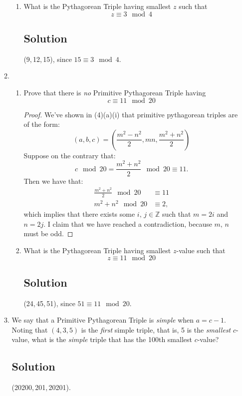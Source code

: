 \documentclass[12pt]{amsart}
\begin{document}
\begin{enumerate}
\begin{enumerate}
\begin{enumerate}
\item What is the Pythagorean Triple having smallest $z$ such that
\[ z \equiv 3 \mod 4 \]
\subsection*{Solution}
(9,\,12,\,15), since $15 \equiv 3 \mod 4$.

\end{enumerate}
\item
\begin{enumerate}\setlength{\itemsep}{6pt}
\item Prove that there is {\it no} Primitive Pythagorean Triple having
\[c \equiv 11\mod 20\]
\begin{proof}
We've shown in (4)(a)(i) that primitive pythagorean triples are of the form:
\[ (a, b, c) = \left( \frac{m^2 - n^2} 2, mn, \frac{m^2 + n^2} 2 \right) \]
Suppose on the contrary that:
\[ c \mod 20 = \frac {m^2 + n^2} 2 \mod 20 \equiv 11. \]
Then we have that:
\begin{align*}
\frac {m^2 + n^2} 2 \mod 20 &\equiv 11 \\
m^2 + n^2 \mod 20 &\equiv 2,
\end{align*}
which implies that there exists some $i,\,j\in\mathbb Z$ such that $m = 2i$ and $n=2j$. I claim that we have reached a contradiction, because $m,\,n$ must be odd.
\end{proof}

\item What is the Pythagorean Triple having smallest $z$-value such that
\[z \equiv 11\mod 20\]
\subsection*{Solution}
(24,\,45,\,51), since $51 \equiv 11 \mod 20$.

\end{enumerate}
\item We say that a Primitive Pythagorean Triple is {\it simple} when $a=c-1$. Noting that $(4,3,5)$ is the {\it first} simple triple, that is, 5 is the {\it smallest} $c$-value, what is the {\it simple} triple that has the 100th smallest $c$-value?
\subsection*{Solution}
(20200,\,201,\,20201).


\end{enumerate}
\end{enumerate}
\end{document}
